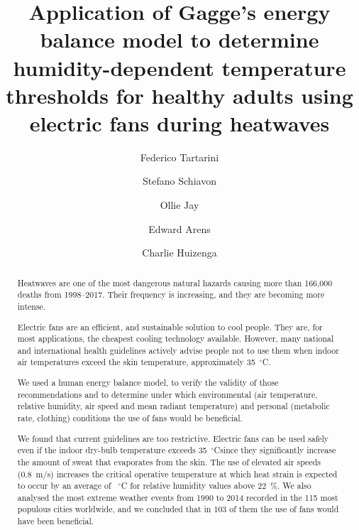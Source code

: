 
\begin{frontmatter}

\title{Application of Gagge's energy balance model to determine humidity-dependent temperature thresholds for healthy adults using electric fans during heatwaves}

\author[sinBerBest]{Federico Tartarini}
\author[CBE]{Stefano Schiavon}
\author[USYD]{Ollie Jay}
\author[CBE]{Edward Arens}
\author[CBE]{Charlie Huizenga}

\address[sinBerBest]{SinBerBEST, Berkeley Education Alliance for Research in Singapore, Singapore}
\address[CBE]{Center for the Built Environment, University of California, Berkeley, USA}
\address[USYD]{Sydney School of Health Sciences, Faculty of Medicine and Health, The University of Sydney, Sydney, Australia}

\begin{abstract}
    Heatwaves are one of the most dangerous natural hazards causing more than 166,000 deaths from 1998--2017.
    Their frequency is increasing, and they are becoming more intense.

    Electric fans are an efficient, and sustainable solution to cool people.
    They are, for most applications, the cheapest cooling technology available.
    However, many national and international health guidelines actively advise people not to use them when indoor air temperatures exceed the skin temperature, approximately 35~$^{\circ}$C\@.

    We used a human energy balance model, to verify the validity of those recommendations and to determine under which environmental (air temperature, relative humidity, air speed and mean radiant temperature) and personal (metabolic rate, clothing) conditions the use of fans would be beneficial.

    We found that current guidelines are too restrictive.
    Electric fans can be used safely even if the indoor dry-bulb temperature exceeds 35~$^{\circ}$C\@ since they significantly increase the amount of sweat that evaporates from the skin.
    The use of elevated air speeds (0.8~m/s) increases the critical operative temperature at which heat strain is expected to occur by an average of ~$^{\circ}$C for relative humidity values above 22~\%\@.
    We also analysed the most extreme weather events from 1990 to 2014 recorded in the 115 most populous cities worldwide, and we concluded that in 103 of them the use of fans would have been beneficial.


\end{abstract}
\end{frontmatter}
